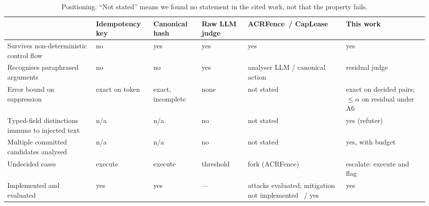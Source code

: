 \begin{table}[!tbp]
\centering\scriptsize\setlength{\tabcolsep}{3.5pt}
\caption{Positioning. ``Not stated'' means we found no statement in the cited work, not that the property fails.}\label{tab:positioning}
\begin{tabularx}{\linewidth}{@{}p{3.4cm}>{\raggedright\arraybackslash}X>{\raggedright\arraybackslash}X>{\raggedright\arraybackslash}X>{\raggedright\arraybackslash}X>{\raggedright\arraybackslash}X@{}}
\toprule
 & Idempotency key & Canonical hash & Raw LLM judge & ACRFence~/ CapLease & This work \\
\midrule
Survives non-deterministic control flow & no & yes & yes & yes & yes \\
Recognises paraphrased arguments & no & no & yes & analyser LLM / canonical action & residual judge \\
Error bound on suppression & exact on token & exact, incomplete & none & not stated & exact on decided pairs; $\le\alpha$ on residual under A6 \\
Typed-field distinctions immune to injected text & n/a & n/a & no & not stated & yes (refuter) \\
Multiple committed candidates analysed & n/a & n/a & no & not stated & yes, with budget \\
Undecided cases & execute & execute & threshold & fork (ACRFence) & escalate: execute and flag \\
Implemented and evaluated & yes & yes & --- & attacks evaluated; mitigation not implemented~\cite{zheng2026acrfence} / yes & yes \\
\bottomrule
\end{tabularx}
\end{table}
